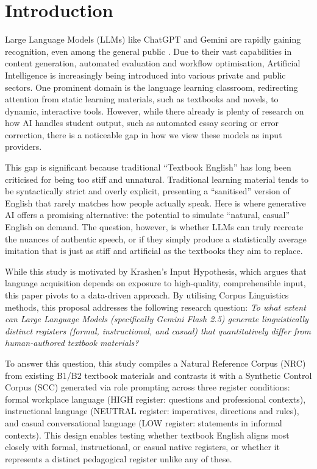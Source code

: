 \setcounter{page}{1} 

\section{Introduction}
Large Language Models (LLMs) like ChatGPT and Gemini are rapidly gaining recognition, even among the general public \parencite[see][]{mikhaylovArtificialIntelligencePublic2018}. Due to their vast capabilities in content generation, automated evaluation and workflow optimisation, Artificial Intelligence is increasingly being introduced into various private and public sectors. One prominent domain is the language learning classroom, redirecting attention from static learning materials, such as textbooks and novels, to dynamic, interactive tools. However, while there already is plenty of research on how AI handles student output, such as automated essay scoring or error correction, there is a noticeable gap in how we view these models as input providers.

This gap is significant because traditional ``Textbook English'' has long been criticised for being too stiff and unnatural. Traditional learning material tends to be syntactically strict and overly explicit, presenting a ``sanitised'' version of English that rarely matches how people actually speak. Here is where generative AI offers a promising alternative: the potential to simulate ``natural, casual'' English on demand. The question, however, is whether LLMs can truly recreate the nuances of authentic speech, or if they simply produce a statistically average imitation that is just as stiff and artificial as the textbooks they aim to replace.

While this study is motivated by Krashen's Input Hypothesis, which argues that language acquisition depends on exposure to high-quality, comprehensible input, this paper pivots to a data-driven approach. By utilising Corpus Linguistics methods, this proposal addresses the following research question: \textit{To what extent can Large Language Models (specifically Gemini Flash 2.5) generate linguistically distinct registers (formal, instructional, and casual) that quantitatively differ from human-authored textbook materials?} 

To answer this question, this study compiles a Natural Reference Corpus (NRC) from existing B1/B2 textbook materials and contrasts it with a Synthetic Control Corpus (SCC) generated via role prompting across three register conditions: formal workplace language (HIGH register: questions and professional contexts), instructional language (NEUTRAL register: imperatives, directions and rules), and casual conversational language (LOW register: statements in informal contexts). This design enables testing whether textbook English aligns most closely with formal, instructional, or casual native registers, or whether it represents a distinct pedagogical register unlike any of these.

